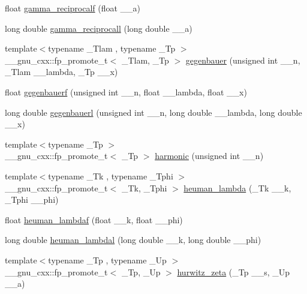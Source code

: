 \begin{DoxyCompactItemize}
\item 
float \hyperlink{group__mathsf__gnu_ga10cccd5045490ac24590c094c43107d8}{gamma\+\_\+reciprocalf} (float \+\_\+\+\_\+a)
\item 
long double \hyperlink{group__mathsf__gnu_ga73bfcace13daa8b50e7e7e3f583a2eb0}{gamma\+\_\+reciprocall} (long double \+\_\+\+\_\+a)
\item 
{\footnotesize template$<$typename \+\_\+\+Tlam , typename \+\_\+\+Tp $>$ }\\\+\_\+\+\_\+gnu\+\_\+cxx\+::fp\+\_\+promote\+\_\+t$<$ \+\_\+\+Tlam, \+\_\+\+Tp $>$ \hyperlink{group__mathsf__gnu_ga512e7981e328d6184f604de1892048b6}{gegenbauer} (unsigned int \+\_\+\+\_\+n, \+\_\+\+Tlam \+\_\+\+\_\+lambda, \+\_\+\+Tp \+\_\+\+\_\+x)
\item 
float \hyperlink{group__mathsf__gnu_ga3eda0a3546848c5b3a2d4d9b5910d6b1}{gegenbauerf} (unsigned int \+\_\+\+\_\+n, float \+\_\+\+\_\+lambda, float \+\_\+\+\_\+x)
\item 
long double \hyperlink{group__mathsf__gnu_ga1f1110d7a116bd5636924bb96d24ecc3}{gegenbauerl} (unsigned int \+\_\+\+\_\+n, long double \+\_\+\+\_\+lambda, long double \+\_\+\+\_\+x)
\item 
{\footnotesize template$<$typename \+\_\+\+Tp $>$ }\\\+\_\+\+\_\+gnu\+\_\+cxx\+::fp\+\_\+promote\+\_\+t$<$ \+\_\+\+Tp $>$ \hyperlink{group__mathsf__gnu_gab052b72af9c7ec030bcea81965390614}{harmonic} (unsigned int \+\_\+\+\_\+n)
\item 
{\footnotesize template$<$typename \+\_\+\+Tk , typename \+\_\+\+Tphi $>$ }\\\+\_\+\+\_\+gnu\+\_\+cxx\+::fp\+\_\+promote\+\_\+t$<$ \+\_\+\+Tk, \+\_\+\+Tphi $>$ \hyperlink{group__mathsf__gnu_ga7537f96eedc8571ed1987481b2863e89}{heuman\+\_\+lambda} (\+\_\+\+Tk \+\_\+\+\_\+k, \+\_\+\+Tphi \+\_\+\+\_\+phi)
\item 
float \hyperlink{group__mathsf__gnu_ga10cf5d54d985aa3a58cb197601040ac8}{heuman\+\_\+lambdaf} (float \+\_\+\+\_\+k, float \+\_\+\+\_\+phi)
\item 
long double \hyperlink{group__mathsf__gnu_gadadaeb83b3d9c2fccd33ab8ec3188df5}{heuman\+\_\+lambdal} (long double \+\_\+\+\_\+k, long double \+\_\+\+\_\+phi)
\item 
{\footnotesize template$<$typename \+\_\+\+Tp , typename \+\_\+\+Up $>$ }\\\+\_\+\+\_\+gnu\+\_\+cxx\+::fp\+\_\+promote\+\_\+t$<$ \+\_\+\+Tp, \+\_\+\+Up $>$ \hyperlink{group__mathsf__gnu_ga7b167ce1c8d9aa6aad40fc83a95733bd}{hurwitz\+\_\+zeta} (\+\_\+\+Tp \+\_\+\+\_\+s, \+\_\+\+Up \+\_\+\+\_\+a)

\end{DoxyCompactItemize}

